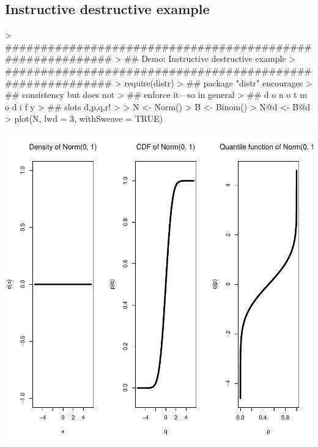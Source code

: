 \documentclass[11pt]{article}
\begin{document}
\subsection{Instructive destructive example}\label{destrex}
\begin{Schunk}
\begin{Sinput}
> ##########################################################
> ## Demo: Instructive destructive example
> ##########################################################
> require(distr)
> ## package "distr" encourages 
> ## consistency but does not 
> ## enforce it---so in general  
> ## d o   n o t   m o d i f y
> ## slots d,p,q,r!
> 
> N <- Norm()
> B <- Binom()
> N@d <- B@d
> plot(N, lwd = 3, withSweave = TRUE) 
\end{Sinput}
\end{Schunk}
\includegraphics{distr-destructive}
\end{document}
